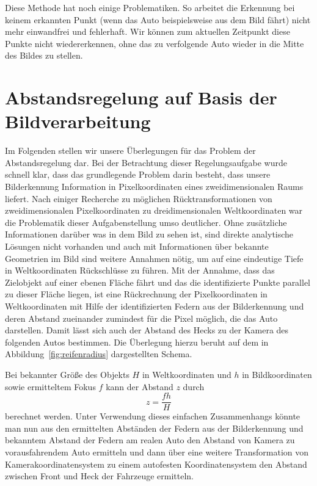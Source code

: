 \documentclass[10pt]{article}
\begin{document}
        Diese Methode hat noch einige Problematiken.
        So arbeitet die Erkennung bei keinem erkannten Punkt (wenn das Auto beispielsweise \glqq{}aus dem Bild fährt\grqq{}) nicht mehr einwandfrei und fehlerhaft.
        Wir können zum aktuellen Zeitpunkt diese Punkte nicht wiedererkennen, ohne das zu verfolgende Auto wieder in die Mitte des Bildes zu stellen.



\section{Abstandsregelung auf Basis der Bildverarbeitung}\label{sec:Abstandsreglung}
    Im Folgenden stellen wir unsere Überlegungen für das Problem der Abstandsregelung dar.
    Bei der Betrachtung dieser Regelungsaufgabe wurde schnell klar, dass das grundlegende Problem darin besteht, dass unsere Bilderkennung Information in Pixelkoordinaten eines zweidimensionalen Raums liefert.
    Nach einiger Recherche zu möglichen Rücktransformationen von zweidimensionalen Pixelkoordinaten zu dreidimensionalen Weltkoordinaten war die Problematik dieser Aufgabenstellung umso deutlicher.
    Ohne zusätzliche Informationen darüber was in dem Bild zu sehen ist, sind direkte analytische Lösungen nicht vorhanden und auch mit Informationen über bekannte Geometrien im Bild sind weitere Annahmen nötig, um auf eine eindeutige Tiefe in Weltkoordinaten Rückschlüsse zu führen.
    Mit der Annahme, dass das Zielobjekt auf einer ebenen Fläche fährt und das die identifizierte Punkte parallel zu dieser Fläche liegen, ist eine Rückrechnung der Pixelkoordinaten in Weltkoordinaten mit Hilfe der identifizierten Federn aus der Bilderkennung und deren Abstand zueinander zumindest für die Pixel möglich, die das Auto darstellen.
    Damit lässt sich auch der Abstand des Hecks zu der Kamera des folgenden Autos bestimmen.
    Die Überlegung hierzu beruht auf dem in Abbildung~\ref{fig:reifenradius} dargestellten Schema.

    Bei bekannter Größe des Objekts $H$ in Weltkoordinaten und $h$ in Bildkoordinaten sowie ermitteltem Fokus $f$ kann der Abstand $z$ durch \[
    z = \frac{fh}{H}
    \] berechnet werden.
    Unter Verwendung dieses einfachen Zusammenhangs könnte man nun aus den ermittelten Abständen der Federn aus der Bilderkennung und bekanntem Abstand der Federn am realen Auto den Abstand von Kamera zu vorausfahrendem Auto ermitteln und dann über eine weitere Transformation von Kamerakoordinatensystem zu einem autofesten Koordinatensystem den Abstand zwischen Front und Heck der Fahrzeuge ermitteln.
\end{document}
